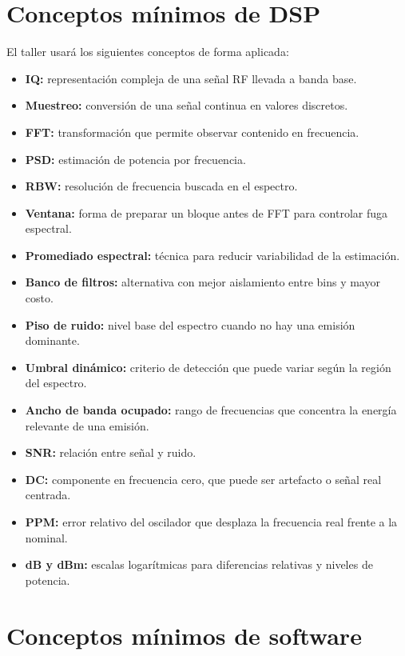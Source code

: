 \documentclass[11pt,a4paper]{article}
\begin{document}
\section*{Conceptos mínimos de DSP}

El taller usará los siguientes conceptos de forma aplicada:

\begin{itemize}
  \item \textbf{IQ:} representación compleja de una señal RF llevada a banda base.
  \item \textbf{Muestreo:} conversión de una señal continua en valores discretos.
  \item \textbf{FFT:} transformación que permite observar contenido en frecuencia.
  \item \textbf{PSD:} estimación de potencia por frecuencia.
  \item \textbf{RBW:} resolución de frecuencia buscada en el espectro.
  \item \textbf{Ventana:} forma de preparar un bloque antes de FFT para controlar fuga espectral.
  \item \textbf{Promediado espectral:} técnica para reducir variabilidad de la estimación.
  \item \textbf{Banco de filtros:} alternativa con mejor aislamiento entre bins y mayor costo.
  \item \textbf{Piso de ruido:} nivel base del espectro cuando no hay una emisión dominante.
  \item \textbf{Umbral dinámico:} criterio de detección que puede variar según la región del espectro.
  \item \textbf{Ancho de banda ocupado:} rango de frecuencias que concentra la energía relevante de una emisión.
  \item \textbf{SNR:} relación entre señal y ruido.
  \item \textbf{DC:} componente en frecuencia cero, que puede ser artefacto o señal real centrada.
  \item \textbf{PPM:} error relativo del oscilador que desplaza la frecuencia real frente a la nominal.
  \item \textbf{dB y dBm:} escalas logarítmicas para diferencias relativas y niveles de potencia.
\end{itemize}

\section*{Conceptos mínimos de software}
\end{document}
